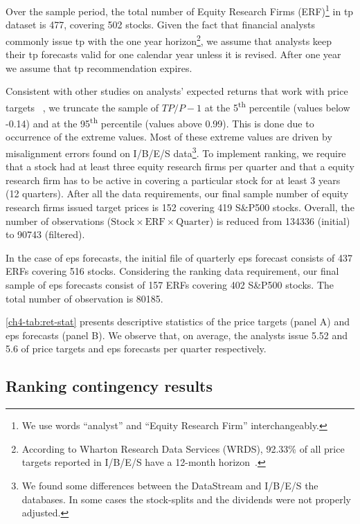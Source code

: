 \documentclass[a4paper,twoside,12pt,openright,notitlepage]{report}\usepackage[]{graphicx}\usepackage[]{color}
\begin{document}
Over the sample period, the total number of Equity Research Firms (ERF)\footnote{We use words ``analyst'' and ``Equity Research Firm'' interchangeably.} in \gls{tp} dataset is 477, covering 502  stocks. Given the fact that financial analysts commonly issue \gls{tp} with the one year horizon\footnote{According to Wharton Research Data Services (WRDS), 92.33\% of all price targets reported in I/B/E/S have a 12-month horizon~\citep{glushkov2009}.}, we assume that analysts keep their \gls{tp} forecasts valid for one calendar year unless it is revised. After one year we assume that \gls{tp} recommendation expires.

Consistent with other studies on analysts' expected returns that work with price targets ~\citep{bradshaw2002,brav2003,da2011}, we truncate the sample of $TP/P-1$ at the 5\textsuperscript{th} percentile (values below -0.14) and at the 95\textsuperscript{th} percentile (values above 0.99). This is done due to occurrence of the extreme values. Most of these extreme values are driven by misalignment errors found on I/B/E/S data\footnote{We found some differences between the  DataStream and I/B/E/S the databases. In some cases the stock-splits and the dividends were not properly adjusted.}. To implement ranking, we require that a stock had at least three equity research firms per quarter and that a equity research firm has to be active in covering a particular stock for at least 3 years (12 quarters). After all the  data requirements, our final sample number of equity research firms issued target prices is 152 covering 419 S\&P500 stocks. Overall, the number of observations ($\mathrm{Stock} \times \mathrm{ERF} \times  \mathrm{Quarter}$) is reduced  from 134336 (initial) to 90743 (filtered).

In the case of \gls{eps} forecasts, the initial file of quarterly \gls{eps} forecast consists of 437 ERFs covering 516 stocks. Considering the ranking data requirement, our final sample of \gls{eps} forecasts consist of  157 ERFs covering 402 S\&P500 stocks. The total number of observation is 80185.

\ref{ch4-tab:ret-stat} presents descriptive statistics of the price targets (panel A) and \gls{eps} forecasts (panel B). We observe that, on average, the analysts issue 5.52 and 5.6 of price targets and \gls{eps} forecasts per quarter respectively.

\subsection{Ranking contingency results}
\label{ch4-tab:rank-contin}
\end{document}
